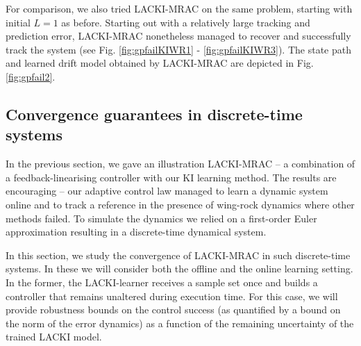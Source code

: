 \documentclass{article} %
\theoremstyle{definition}
\theoremstyle{remark}
\begin{document}
For comparison, we also tried LACKI-MRAC on the same problem, starting with initial $L=1$ as before. Starting out with a relatively large tracking and prediction error, LACKI-MRAC nonetheless managed to recover and successfully track the system (see  Fig.  \ref{fig:gpfailKIWR1} -  \ref{fig:gpfailKIWR3}). The state path and learned drift model obtained by LACKI-MRAC are depicted in Fig. \ref{fig:gpfail2}.
%
\begin{figure*}
        \centering
   \caption{Depicted are the state path and the drift model learned online by LACKI-MRAC.}
	\label{fig:gpfail2}
\end{figure*}	 


\subsection{Convergence guarantees in discrete-time systems}
\label{sec:KIMRACstabbounds}

In the previous section, we gave an illustration LACKI-MRAC -- a combination of a feedback-linearising controller with our KI learning method. The results are encouraging -- our adaptive control law managed to learn a dynamic system online and to track a reference in the presence of wing-rock dynamics where other methods failed. 
To simulate the dynamics we relied on a first-order Euler approximation resulting in a discrete-time dynamical system.

In this section, we study the convergence of LACKI-MRAC in such discrete-time systems.
In these we will consider both the offline and the online learning setting. In the former, the LACKI-learner receives a sample set once and builds a controller that remains unaltered during execution time.
For this case, we will provide robustness bounds on the control success (as quantified by a bound on the norm of the error dynamics) as a function of the remaining uncertainty of the trained LACKI model. 
\end{document}
